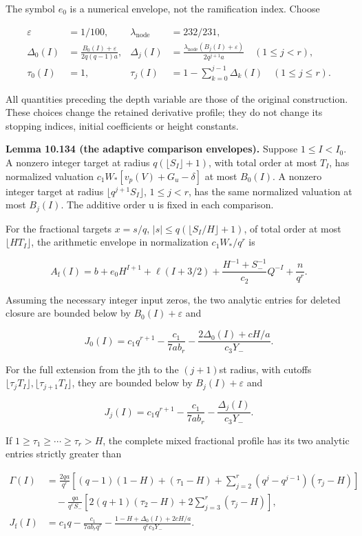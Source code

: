 \documentclass[
  11pt,
  a4paper,
]{article}
\begin{document}
The symbol \(e_0\) is a numerical envelope, not the ramification index.
Choose

\[
\begin{aligned}
\varepsilon&=1/100,&\lambda_{\mathrm{node}}&=232/231,\\
\Delta_0(I)&=\frac{B_0(I)+\varepsilon}{2q(q-1)a},&
\Delta_j(I)&=\frac{\lambda_{\mathrm{node}}(B_j(I)+\varepsilon)}{2q^{j+1}a}\quad(1\le j<r),\\
\tau_0(I)&=1,&
\tau_j(I)&=1-\sum_{k=0}^{j-1}\Delta_k(I)\quad(1\le j\le r).
\end{aligned}
\tag{10.363}
\]

All quantities preceding the depth variable are those of the original
construction. These choices change the retained derivative profile; they
do not change its stopping indices, initial coefficients or height
constants.

\textbf{Lemma 10.134 (the adaptive comparison envelopes).} Suppose
\(1\le I<I_0\). A nonzero integer target at radius
\(q(\lfloor S_I\rfloor+1)\), with total order at most \(T_I\), has
normalized valuation \(c_1W_*[v_p(V)+G_u-\delta]\) at most \(B_0(I)\). A
nonzero integer target at radius \(\lfloor q^{j+1}S_I\rfloor\),
\(1\le j<r\), has the same normalized valuation at most \(B_j(I)\). The
additive order u is fixed in each comparison.

For the fractional targets \(x=s/q\),
\(|s|\le q(\lfloor S_I/H\rfloor+1)\), of total order at most
\(\lfloor HT_I\rfloor\), the arithmetic envelope in normalization
\(c_1W_*/q^r\) is

\[
A_{\mathrm f}(I)=b+e_0H^{I+1}+\ell(I+3/2)
+\frac{H^{-1}+S_-^{-1}}{c_2}Q^{-I}+\frac n{q^r}.
\tag{10.364}
\]

Assuming the necessary integer input zeros, the two analytic entries for
deleted closure are bounded below by \(B_0(I)+\varepsilon\) and

\[
J_0(I)=c_1q^{r+1}-\frac{c_1}{7ab_r}
-\frac{2\Delta_0(I)+cH/a}{c_3Y_-}.
\tag{10.365}
\]

For the full extension from the jth to the \((j+1)\)st radius, with
cutoffs \(\lfloor\tau_jT_I\rfloor,\lfloor\tau_{j+1}T_I\rfloor\), they
are bounded below by \(B_j(I)+\varepsilon\) and

\[
J_j(I)=c_1q^{r+1}-\frac{c_1}{7ab_r}-\frac{\Delta_j(I)}{c_3Y_-}.
\tag{10.366}
\]

If \(1\ge\tau_1\ge\cdots\ge\tau_r>H\), the complete mixed fractional
profile has its two analytic entries strictly greater than

\[
\begin{aligned}
\Gamma(I)&=\frac{2qa}{q^r}
\left[(q-1)(1-H)+(\tau_1-H)
+\sum_{j=2}^r(q^j-q^{j-1})(\tau_j-H)\right]\\
&\quad-\frac{qa}{q^rS_-}
\left[2(q+1)(\tau_2-H)+2\sum_{j=3}^r(\tau_j-H)\right],\\
J_{\mathrm f}(I)&=c_1q-\frac{c_1}{7ab_rq^r}
-\frac{1-H+\Delta_0(I)+2cH/a}{q^rc_3Y_-}.
\end{aligned}
\tag{10.367}
\]
\end{document}
